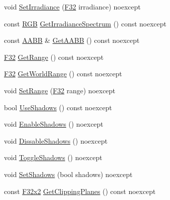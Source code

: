 \begin{DoxyCompactItemize}
void \mbox{\hyperlink{classmage_1_1rendering_1_1_directional_light_af8570b18bfb807492317e4a98f5c7ba6}{Set\+Irradiance}} (\mbox{\hyperlink{namespacemage_aa97e833b45f06d60a0a9c4fc22ae02c0}{F32}} irradiance) noexcept
\item 
const \mbox{\hyperlink{structmage_1_1_r_g_b}{R\+GB}} \mbox{\hyperlink{classmage_1_1rendering_1_1_directional_light_a3a99d3d63a686f8bc587015115a85a81}{Get\+Irradiance\+Spectrum}} () const noexcept
\item 
const \mbox{\hyperlink{classmage_1_1_a_a_b_b}{A\+A\+BB}} \& \mbox{\hyperlink{classmage_1_1rendering_1_1_directional_light_a0fdc09e70e3218f69de15c33436fc7ac}{Get\+A\+A\+BB}} () const noexcept
\item 
\mbox{\hyperlink{namespacemage_aa97e833b45f06d60a0a9c4fc22ae02c0}{F32}} \mbox{\hyperlink{classmage_1_1rendering_1_1_directional_light_a488b39bbc5f602fcc4aede228e971a18}{Get\+Range}} () const noexcept
\item 
\mbox{\hyperlink{namespacemage_aa97e833b45f06d60a0a9c4fc22ae02c0}{F32}} \mbox{\hyperlink{classmage_1_1rendering_1_1_directional_light_a62e8286172a0fe23878f23de2dded6cb}{Get\+World\+Range}} () const noexcept
\item 
void \mbox{\hyperlink{classmage_1_1rendering_1_1_directional_light_a4cfe435db538b10a6bc3aeab9c71dd45}{Set\+Range}} (\mbox{\hyperlink{namespacemage_aa97e833b45f06d60a0a9c4fc22ae02c0}{F32}} range) noexcept
\item 
bool \mbox{\hyperlink{classmage_1_1rendering_1_1_directional_light_a129904147256d111ec56cc3ddc502157}{Use\+Shadows}} () const noexcept
\item 
void \mbox{\hyperlink{classmage_1_1rendering_1_1_directional_light_abafdec9ce9ca0263724ce8ddba430b1b}{Enable\+Shadows}} () noexcept
\item 
void \mbox{\hyperlink{classmage_1_1rendering_1_1_directional_light_a7b0b25df35d2c1121bf08cb0a733b858}{Dissable\+Shadows}} () noexcept
\item 
void \mbox{\hyperlink{classmage_1_1rendering_1_1_directional_light_a34a939e192e857ac25f6d91dd773ec9b}{Toggle\+Shadows}} () noexcept
\item 
void \mbox{\hyperlink{classmage_1_1rendering_1_1_directional_light_a4a8aa135c9366993f6343b33cd4ed9e0}{Set\+Shadows}} (bool shadows) noexcept
\item 
const \mbox{\hyperlink{namespacemage_a9dc0d34d6ecc87e4cfa4a826102117bc}{F32x2}} \mbox{\hyperlink{classmage_1_1rendering_1_1_directional_light_a178b7c303793864eaa0d58c81256760d}{Get\+Clipping\+Planes}} () const noexcept

\end{DoxyCompactItemize}

